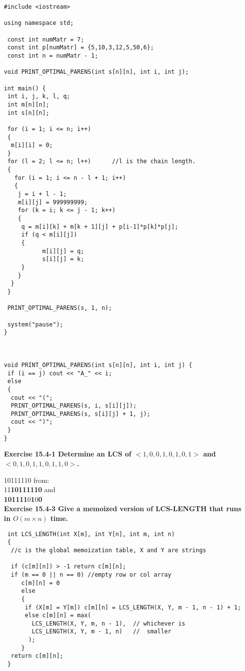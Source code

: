 \documentclass[10pt,fullpage]{article}
\begin{document}
\lstset{language=c++} \lstset{linewidth=90mm}
\begin{lstlisting}
#include <iostream>

using namespace std;

 const int numMatr = 7;
 const int p[numMatr] = {5,10,3,12,5,50,6};
 const int n = numMatr - 1;

void PRINT_OPTIMAL_PARENS(int s[n][n], int i, int j);

int main() {
 int i, j, k, l, q;
 int m[n][n];
 int s[n][n];

 for (i = 1; i <= n; i++)
 {
  m[i][i] = 0;
 }
 for (l = 2; l <= n; l++)      //l is the chain length.
 {
   for (i = 1; i <= n - l + 1; i++)
   {
    j = i + l - 1;
    m[i][j] = 999999999;
    for (k = i; k <= j - 1; k++)
    {
     q = m[i][k] + m[k + 1][j] + p[i-1]*p[k]*p[j];
     if (q < m[i][j])
     {
           m[i][j] = q;
           s[i][j] = k;
     }
    }
  }
 }

 PRINT_OPTIMAL_PARENS(s, 1, n);

 system("pause");
}



void PRINT_OPTIMAL_PARENS(int s[n][n], int i, int j) {
 if (i == j) cout << "A_" << i;
 else
 {
  cout << "(";
  PRINT_OPTIMAL_PARENS(s, i, s[i][j]);
  PRINT_OPTIMAL_PARENS(s, s[i][j] + 1, j);
  cout << ")";
 }
}
        \end{lstlisting}

\newpage

\textbf{Exercise 15.4-1 Determine an LCS of $<1, 0, 0, 1, 0, 1, 0,
1>$ and $<0, 1, 0, 1, 1, 0, 1, 1, 0>$.}

10111110 from:\\
11\textbf{10111110} and \\
\textbf{101111}0\textbf{1}0\textbf{0}\\

\textbf{Exercise 15.4-3 Give a memoized version of LCS-LENGTH that
runs in $O(m \times n)$ time.}
\begin{lstlisting}
 int LCS_LENGTH(int X[m], int Y[n], int m, int n)
 {
  //c is the global memoization table, X and Y are strings

  if (c[m][n]) > -1 return c[m][n];
  if (m == 0 || n == 0) //empty row or col array
     c[m][n] = 0
     else
     {
      if (X[m] = Y[m]) c[m][n] = LCS_LENGTH(X, Y, m - 1, n - 1) + 1;
      else c[m][n] = max(
        LCS_LENGTH(X, Y, m, n - 1),  // whichever is
        LCS_LENGTH(X, Y, m - 1, n)   //  smaller
       );
     }
  return c[m][n];
 }
\end{lstlisting}
\end{document}
